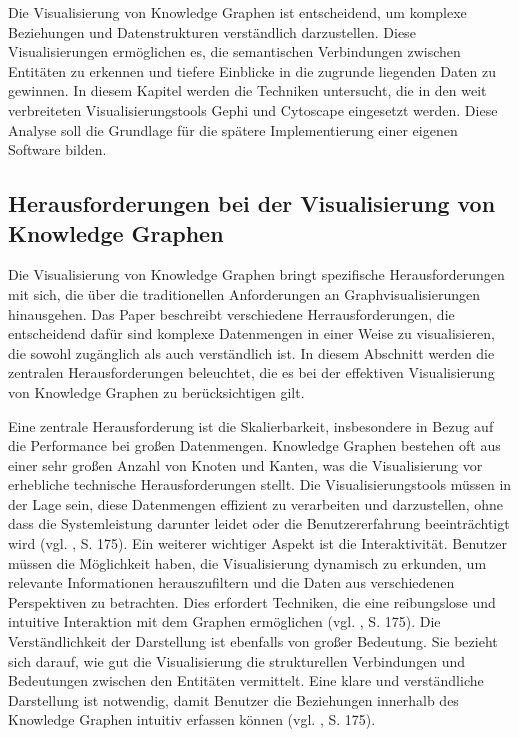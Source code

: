 Die Visualisierung von Knowledge Graphen ist entscheidend, um komplexe Beziehungen und Datenstrukturen verständlich darzustellen. Diese Visualisierungen ermöglichen es, die semantischen Verbindungen zwischen Entitäten zu erkennen und tiefere Einblicke in die zugrunde liegenden Daten zu gewinnen. In diesem Kapitel werden die Techniken untersucht, die in den weit verbreiteten Visualisierungstools Gephi und Cytoscape eingesetzt werden. Diese Analyse soll die Grundlage für die spätere Implementierung einer eigenen Software bilden.

\subsection{Herausforderungen bei der Visualisierung von Knowledge Graphen}

Die Visualisierung von Knowledge Graphen bringt spezifische Herausforderungen mit sich, die über die traditionellen Anforderungen an Graphvisualisierungen hinausgehen. Das Paper  beschreibt verschiedene Herrausforderungen, die entscheidend dafür sind komplexe Datenmengen in einer Weise zu visualisieren, die sowohl zugänglich als auch verständlich ist. In diesem Abschnitt werden die zentralen Herausforderungen beleuchtet, die es bei der effektiven Visualisierung von Knowledge Graphen zu berücksichtigen gilt.

Eine zentrale Herausforderung ist die Skalierbarkeit, insbesondere in Bezug auf die Performance bei großen Datenmengen. Knowledge Graphen bestehen oft aus einer sehr großen Anzahl von Knoten und Kanten, was die Visualisierung vor erhebliche technische Herausforderungen stellt. Die Visualisierungstools müssen in der Lage sein, diese Datenmengen effizient zu verarbeiten und darzustellen, ohne dass die Systemleistung darunter leidet oder die Benutzererfahrung beeinträchtigt wird (vgl. \cite{kgVisualization:Nararatwong}, S. 175).  Ein weiterer wichtiger Aspekt ist die Interaktivität. Benutzer müssen die Möglichkeit haben, die Visualisierung dynamisch zu erkunden, um relevante Informationen herauszufiltern und die Daten aus verschiedenen Perspektiven zu betrachten. Dies erfordert Techniken, die eine reibungslose und intuitive Interaktion mit dem Graphen ermöglichen (vgl. \cite{kgVisualization:Nararatwong}, S. 175). Die Verständlichkeit der Darstellung ist ebenfalls von großer Bedeutung. Sie bezieht sich darauf, wie gut die Visualisierung die strukturellen Verbindungen und Bedeutungen zwischen den Entitäten vermittelt. Eine klare und verständliche Darstellung ist notwendig, damit Benutzer die Beziehungen innerhalb des Knowledge Graphen intuitiv erfassen können (vgl. \cite{kgVisualization:Nararatwong}, S. 175).

